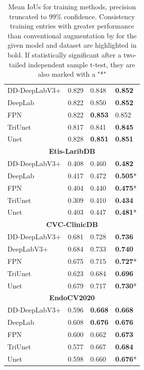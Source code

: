 \begin{table}[htb]
\begin{tabularx}{\linewidth}{llXX}
        DD-DeepLabV3+& 0.829 & 0.848 & \textbf{0.852} \\
        DeepLab& 0.822 & 0.850 & \textbf{0.852} \\
        FPN& 0.822 & \textbf{0.853} & 0.852 \\
        TriUnet& 0.817 & 0.841 & \textbf{0.845} \\
        Unet& 0.828 & \textbf{0.851} & \textbf{0.851} \\
\midrule
\multicolumn{4}{c}{\textbf{Etis-LaribDB}}\\
\midrule
        DD-DeepLabV3+& 0.408 & 0.460 & \textbf{0.482 }\\
        DeepLab& 0.417 & 0.472 & \textbf{0.505}* \\
        FPN& 0.404 & 0.440 & \textbf{0.475}* \\
        TriUnet& 0.309 & 0.410 & \textbf{0.434} \\
        Unet& 0.403 & 0.447 & \textbf{0.481}* \\
\midrule
\multicolumn{4}{c}{\textbf{CVC-ClinicDB}}\\
\midrule
        DD-DeepLabV3+ & 0.681 & 0.728 & \textbf{0.736} \\
        DeepLabV3+& 0.684 & 0.733 & \textbf{0.740} \\
        FPN& 0.675 & 0.715 & \textbf{0.727}* \\
        TriUnet& 0.623 & 0.684 & \textbf{0.696} \\
        Unet& 0.679 & 0.717 & \textbf{0.730}* \\
\midrule
\multicolumn{4}{c}{\textbf{EndoCV2020}}\\
\midrule
        DD-DeepLabV3+& 0.596 & \textbf{0.668} & \textbf{0.668} \\
        DeepLab& 0.608 & \textbf{0.676} & \textbf{0.676} \\
        FPN& 0.600 & 0.662 & \textbf{0.673 }\\
        TriUnet& 0.577 & 0.667 & \textbf{0.684} \\
        Unet& 0.598 & 0.660 & \textbf{0.676}*\\
\bottomrule
    \end{tabularx}
    \caption[Mean IoUs for training methods]{Mean IoUs for training methods, precision truncated to 99\% confidence. Consistency training entries with greater performance than conventional augmentation by for the given model and dataset are highlighted in bold. If statistically significant after a two-tailed independent sample t-test, they are also marked with a "*"}
    \label{tab:consistency}
\end{table}

